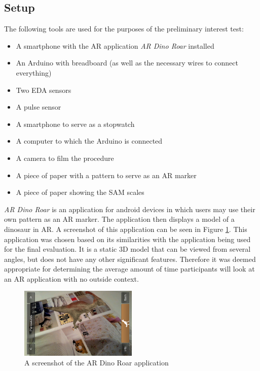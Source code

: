 \subsection{Setup}
The following tools are used for the purposes of the preliminary interest test:

\begin{itemize}
    \item A smartphone with the AR application \textit{AR Dino Roar} installed
    \item An Arduino with breadboard (as well as the necessary wires to connect everything)
    \item Two EDA sensors
    \item A pulse sensor
    \item A smartphone to serve as a stopwatch
    \item A computer to which the Arduino is connected
    \item A camera to film the procedure
    \item A piece of paper with a pattern to serve as an AR marker
    \item A piece of paper showing the SAM scales
\end{itemize}

\textit{AR Dino Roar} is an application for android devices in which users may use their own pattern as an AR marker. The application then displays a model of a dinosaur in AR. A screenshot of this application can be seen in Figure \ref{fig:dino}. This application was chosen based on its similarities with the application being used for the final evaluation. It is a static 3D model that can be viewed from several angles, but does not have any other significant features. Therefore it was deemed appropriate for determining the average amount of time participants will look at an AR application with no outside context. 

\begin{figure}[h!]
	\centering
    \includegraphics[width=0.5\textwidth]{figures/AR_dino.png}
    \caption{A screenshot of the AR Dino Roar application \cite{ARDino}}\label{fig:dino}
\end{figure}

